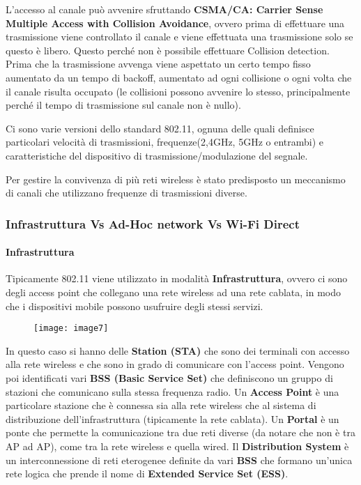 L'accesso al canale può avvenire sfruttando \textbf{CSMA/CA: Carrier Sense
Multiple Access with Collision Avoidance}, ovvero prima di effettuare
una trasmissione viene controllato il canale e viene effettuata una
trasmissione solo se questo è libero. Questo perché non è possibile
effettuare Collision detection. Prima che la trasmissione avvenga viene aspettato
un certo tempo fisso aumentato da un tempo di backoff, aumentato ad ogni 
collisione o ogni volta che il canale risulta occupato (le collisioni possono 
avvenire lo stesso, principalmente perché il tempo di trasmissione sul canale 
non è nullo).

Ci sono varie versioni dello standard 802.11, ognuna delle quali definisce 
particolari velocità di trasmissioni, frequenze(2,4GHz, 5GHz o entrambi) e 
caratteristiche del dispositivo di trasmissione/modulazione del segnale.

Per gestire la convivenza di più reti wireless è stato predisposto un
meccanismo di canali che utilizzano frequenze di trasmissioni diverse.

\subsubsection{Infrastruttura Vs Ad-Hoc network Vs Wi-Fi
Direct}\label{infrastruttura-vs-ad-hoc-network-vs-wi-fi-direct}

\paragraph{Infrastruttura }\label{infrastruttura}

Tipicamente 802.11 viene utilizzato in modalità \textbf{Infrastruttura},
ovvero ci sono degli access point che collegano una rete wireless ad una
rete cablata, in modo che i dispositivi mobile possono usufruire degli
stessi servizi.

\begin{figure}[H]
  \centering
  \texttt{[image: image7]}
\end{figure}

In questo caso si hanno delle \textbf{Station (STA)} che sono dei
terminali con accesso alla rete wireless e che sono in grado di
comunicare con l'access point. Vengono poi identificati vari \textbf{BSS
(Basic Service Set)} che definiscono un gruppo di stazioni che
comunicano sulla stessa frequenza radio. Un \textbf{Access Point} è una
particolare stazione che è connessa sia alla rete wireless che al
sistema di distribuzione dell'infrastruttura (tipicamente la rete
cablata). Un \textbf{Portal} è un ponte che permette la comunicazione
tra due reti diverse (da notare che non è tra AP ad AP), come tra la
rete wireless e quella wired. Il \textbf{Distribution System} è un
interconnessione di reti eterogenee definite da vari \textbf{BSS} che
formano un'unica rete logica che prende il nome di \textbf{Extended
Service Set (ESS)}.

